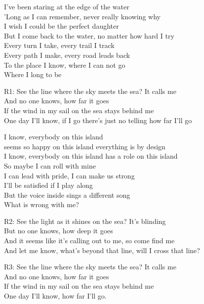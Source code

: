

\ve
{}I've been staring at the edge of the water\\
'Long as I can remember, never really knowing why\\
I wish I could be the perfect daughter\\
But I come back to the water, no matter how hard I try\\
Every turn I take, every trail I track\\
Every path I make, every road leads back\\
To the place I know, where I can not go\\
Where I long to be

\re{}R1:
See the line where the sky meets the sea? It calls me\\
And no one knows, how far it goes\\
If the wind in my sail on the sea stays behind me\\
One day I'll know, if I go there's just no telling how far I'll go


\ve
{}I know, everybody on this island\\
seems so happy on this island everything is by design\\
I know, everybody on this island has a role on this island\\
So maybe I can roll with mine\\
I can lead with pride, I can make us strong\\
I'll be satisfied if I play along\\
But the voice inside sings a different song\\
What is wrong with me?

\re{}R2:
See the light as it shines on the sea? It's blinding\\
But no one knows, how deep it goes\\
And it seems like it's calling out to me, so come find me\\
And let me know, what's beyond that line, will I cross that line?

\re{}R3:
See the line where the sky meets the sea? It calls me\\
And no one knows, how far it goes\\
If the wind in my sail on the sea stays behind me\\
One day I'll know, how far I'll go.\\


\esong

